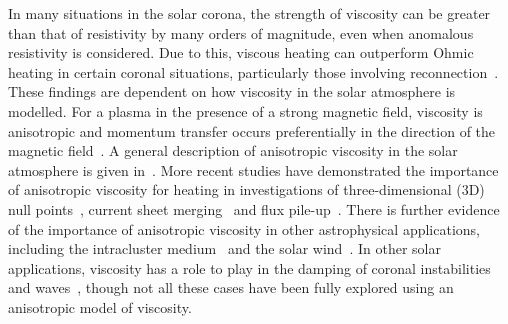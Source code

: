 In many situations in the solar corona, the strength of viscosity
can be greater than that of resistivity by many orders of
magnitude, even when anomalous resistivity is considered. Due to this,
viscous heating can outperform Ohmic heating in certain coronal
situations, particularly those involving
reconnection~\cite{browningMechanismsSolarCoronal1991,
  craigViscousDissipation3D2013a,
  armstrongViscoResistiveDissipation2013,
  hollwegViscosityChewGoldbergerLowEquations1986}. These findings are
dependent on how viscosity in the solar atmosphere is modelled. For a
plasma in the presence of a strong magnetic field, viscosity is
anisotropic and momentum transfer occurs preferentially in the
direction of the magnetic
field~\cite{braginskiiTransportProcessesPlasma1965}. A general
description of anisotropic viscosity in the solar atmosphere is given
in~\cite{hollwegViscosityMagnetizedPlasma1985,
  hollwegViscosityChewGoldbergerLowEquations1986}. More recent
studies have demonstrated the importance of anisotropic viscosity for
heating in investigations of three-dimensional (3D) null
points~\cite{craigViscousDissipation3D2013a}, current sheet
merging~\cite{armstrongViscoResistiveDissipation2013} and flux
pile-up~\cite{litvinenkoViscousEnergyDissipation2005}. There is
further evidence of the importance of anisotropic viscosity in other
astrophysical applications, including the intracluster medium~\cite{zuhoneEffectAnisotropicViscosity2014, parrishEffectsAnisotropicViscosity2012a} and the solar wind~\cite{baleMagneticFluctuationPower2009}. In other solar applications, viscosity has a role to play in the damping of coronal instabilities~\cite{howsonEffectsResistivityViscosity2017} and waves~\cite{vranjesViscosityEffectsWaves2014, erdelyiResonantAbsorptionAlfven1995, rudermanSlowSurfaceWave2000}, though not all these cases have been fully explored using an anisotropic model of viscosity.

